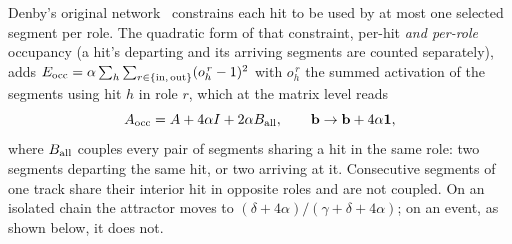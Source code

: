 \documentclass[11pt,a4paper]{article}
\begin{document}
Denby's original network~\cite{denby1988} constrains each hit to be
used by at most one selected segment per role. The quadratic form of
that constraint, per-hit \emph{and per-role} occupancy (a hit's
departing and its arriving segments are counted separately), adds
$E_{\rm occ}=\alpha\sum_h\sum_{r\in\{\rm in,\,out\}}(o_h^{\,r}-1)^2$
with $o_h^{\,r}$ the summed activation of the segments using hit $h$
in role $r$, which at the matrix level reads
\begin{equation}
A_{\rm occ}=A+4\alpha I+2\alpha B_{\rm all},\qquad
\mathbf{b}\to\mathbf{b}+4\alpha\mathbf{1},
\label{eq:occ}
\end{equation}
where $B_{\rm all}$ couples every pair of segments sharing a hit in
the same role: two segments departing the same hit, or two arriving
at it. Consecutive segments of one track share their interior hit in
opposite roles and are not coupled. On an isolated chain the attractor moves to
$(\delta+4\alpha)/(\gamma+\delta+4\alpha)$; on an event, as shown
below, it does not.
\end{document}
